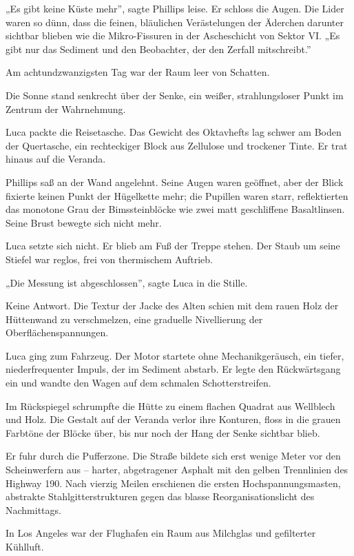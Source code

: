 \documentclass[
  ngerman,
]{article}
\begin{document}
„Es gibt keine Küste mehr'', sagte Phillips leise. Er schloss die Augen.
Die Lider waren so dünn, dass die feinen, bläulichen Verästelungen der
Äderchen darunter sichtbar blieben wie die Mikro-Fissuren in der
Ascheschicht von Sektor VI. „Es gibt nur das Sediment und den
Beobachter, der den Zerfall mitschreibt.''

Am achtundzwanzigsten Tag war der Raum leer von Schatten.

Die Sonne stand senkrecht über der Senke, ein weißer, strahlungsloser
Punkt im Zentrum der Wahrnehmung.

Luca packte die Reisetasche. Das Gewicht des Oktavhefts lag schwer am
Boden der Quertasche, ein rechteckiger Block aus Zellulose und trockener
Tinte. Er trat hinaus auf die Veranda.

Phillips saß an der Wand angelehnt. Seine Augen waren geöffnet, aber der
Blick fixierte keinen Punkt der Hügelkette mehr; die Pupillen waren
starr, reflektierten das monotone Grau der Bimssteinblöcke wie zwei matt
geschliffene Basaltlinsen. Seine Brust bewegte sich nicht mehr.

Luca setzte sich nicht. Er blieb am Fuß der Treppe stehen. Der Staub um
seine Stiefel war reglos, frei von thermischem Auftrieb.

„Die Messung ist abgeschlossen'', sagte Luca in die Stille.

Keine Antwort. Die Textur der Jacke des Alten schien mit dem rauen Holz
der Hüttenwand zu verschmelzen, eine graduelle Nivellierung der
Oberflächenspannungen.

Luca ging zum Fahrzeug. Der Motor startete ohne Mechanikgeräusch, ein
tiefer, niederfrequenter Impuls, der im Sediment abstarb. Er legte den
Rückwärtsgang ein und wandte den Wagen auf dem schmalen
Schotterstreifen.

Im Rückspiegel schrumpfte die Hütte zu einem flachen Quadrat aus
Wellblech und Holz. Die Gestalt auf der Veranda verlor ihre Konturen,
floss in die grauen Farbtöne der Blöcke über, bis nur noch der Hang der
Senke sichtbar blieb.

Er fuhr durch die Pufferzone. Die Straße bildete sich erst wenige Meter
vor den Scheinwerfern aus -- harter, abgetragener Asphalt mit den gelben
Trennlinien des Highway 190. Nach vierzig Meilen erschienen die ersten
Hochspannungsmasten, abstrakte Stahlgitterstrukturen gegen das blasse
Reorganisationslicht des Nachmittags.

In Los Angeles war der Flughafen ein Raum aus Milchglas und gefilterter
Kühlluft.
\end{document}
